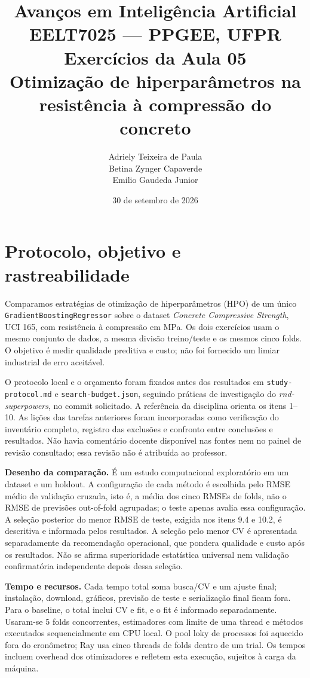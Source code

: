 \documentclass[12pt,a4paper]{article}
\title{\Large\textbf{Avanços em Inteligência Artificial}\\
\large EELT7025 --- PPGEE, UFPR\\[0.3cm]
\normalsize Exercícios da Aula 05\\
\normalsize Otimização de hiperparâmetros na resistência à compressão do concreto}
\author{\parbox{0.94\textwidth}{\centering Adriely Teixeira de Paula\\
Betina Zynger Capaverde\\Emilio Gaudeda Junior}}
\date{30 de setembro de 2026}
\begin{document}
\maketitle
\tableofcontents
\newpage

\section{Protocolo, objetivo e rastreabilidade}

Comparamos estratégias de otimização de hiperparâmetros (HPO) de um único \texttt{GradientBoostingRegressor} sobre o dataset \emph{Concrete Compressive Strength}, UCI 165, com resistência à compressão em MPa\cite{uci}. Os dois exercícios usam o mesmo conjunto de dados, a mesma divisão treino/teste e os mesmos cinco folds. O objetivo é medir qualidade preditiva e custo; não foi fornecido um limiar industrial de erro aceitável.

O protocolo local e o orçamento foram fixados antes dos resultados em \texttt{study-protocol.md} e \texttt{search-budget.json}, seguindo práticas de investigação do \emph{rnd-superpowers}, no commit solicitado\cite{rnd}. A referência da disciplina orienta os itens 1--10\cite{aula}. As lições das tarefas anteriores foram incorporadas como verificação do inventário completo, registro das exclusões e confronto entre conclusões e resultados. Não havia comentário docente disponível nas fontes nem no painel de revisão consultado; essa revisão não é atribuída ao professor.

\textbf{Desenho da comparação.} É um estudo computacional exploratório em um dataset e um holdout. A configuração de cada método é escolhida pelo RMSE médio de validação cruzada, isto é, a média dos cinco RMSEs de folds, não o RMSE de previsões out-of-fold agrupadas; o teste apenas avalia essa configuração. A seleção posterior do menor RMSE de teste, exigida nos itens 9.4 e 10.2, é descritiva e informada pelos resultados. A seleção pelo menor CV é apresentada separadamente da recomendação operacional, que pondera qualidade e custo após os resultados. Não se afirma superioridade estatística universal nem validação confirmatória independente depois dessa seleção.

\textbf{Tempo e recursos.} Cada tempo total soma busca/CV e um ajuste final; instalação, download, gráficos, previsão de teste e serialização final ficam fora. Para o baseline, o total inclui CV e fit, e o fit é informado separadamente. Usaram-se 5 folds concorrentes, estimadores com limite de uma thread e métodos executados sequencialmente em CPU local. O pool loky de processos foi aquecido fora do cronômetro; Ray usa cinco threads de folds dentro de um trial. Os tempos incluem overhead dos otimizadores e refletem esta execução, sujeitos à carga da máquina.
\end{document}
